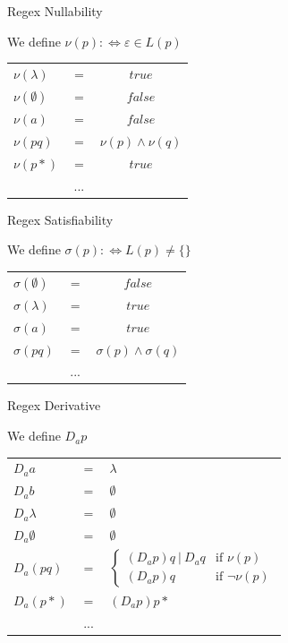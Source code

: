 \documentclass[xcolor=table]{beamer}
\begin{document}
\begin{frame}{Regex Nullability}

\pause
We define $\nu(p) :\Leftrightarrow \varepsilon \in L(p)$\\

\begin{tabular}{l c c}
    \pause
    $\nu(\lambda)$ & $=$ & $true$ \\
    \pause
    $\nu(\emptyset)$ & $=$ & $false$ \\
    \pause
    $\nu(a)$ & $=$ & $false$ \\
    \pause
    $\nu(pq)$ & $=$ & $\nu(p) \land \nu(q)$ \\
    \pause
    $\nu(p*)$ & $=$ & $true$ \\
    \pause
    & ... & \\
\end{tabular}
\end{frame}

\begin{frame}{Regex Satisfiability}

\pause
We define $\sigma(p) :\Leftrightarrow L(p) \neq \{\}$\\

\begin{tabular}{l c c}
    \pause
    $\sigma(\emptyset)$ & $=$ & $false$ \\
    \pause
    $\sigma(\lambda)$ & $=$ & $true$ \\
    \pause
    $\sigma(a)$ & $=$ & $true$ \\
    \pause
    $\sigma(pq)$ & $=$ & $\sigma(p) \land \sigma(q)$ \\
    \pause
    & ... & \\
\end{tabular}
\end{frame}

\begin{frame}{Regex Derivative}

We define $D_ap$\\

\begin{tabular}{l c l}
    \pause
    $D_aa$ & $=$ & $\lambda$ \\
    \pause
    $D_ab$ & $=$ & $\emptyset$ \\
    \pause
    $D_a\lambda$ & $=$ & $\emptyset$ \\
    \pause
    $D_a\emptyset$ & $=$ & $\emptyset$ \\
    \pause

    $D_a(pq)$ & $=$ & $
    \left\{
	\begin{array}{ll}
		(D_ap)q\:|\:D_aq  & \mbox{if } \nu(p) \\
		(D_ap)q & \mbox{if } \neg \nu(p)
	\end{array}
    \right.
    $ \\
    \pause
    
    $D_a(p*)$ & $=$ & $(D_ap)p*$ \\
    \pause
    & ... & \\
\end{tabular}
\end{frame}
\end{document}
